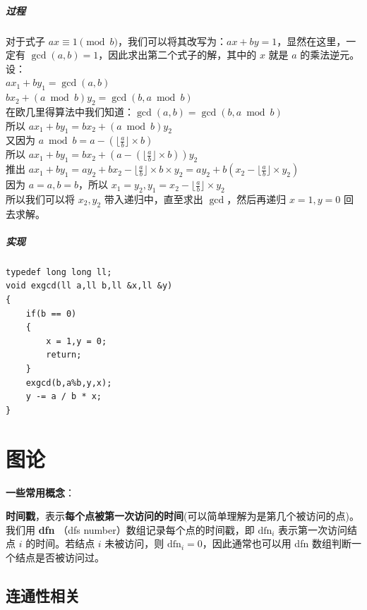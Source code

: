 \documentclass[11pt,oneside,a4paper,UTF8]{book}
\begin{document}
	\subsubsection{过程}
	\noindent
	对于式子 $ax \equiv 1 \pmod b$，我们可以将其改写为：$ax + by = 1$，显然在这里，一定有 $\gcd(a,b) = 1$，因此求出第二个式子的解，其中的 $x$ 就是 $a$ 的乘法逆元。\\
	设：\\
	$ax_1 + by_1 = \gcd(a,b)$\\
	$bx_2 + (a \bmod b)y_2 = \gcd(b,a \bmod b)$\\
	在欧几里得算法中我们知道：$\gcd(a,b) = \gcd(b,a\bmod b)$\\
	所以 $ax_1 + by_1 = bx_2 + (a \bmod b)y_2$\\
	又因为 $a \bmod b = a - (\lfloor\frac{a}{b}\rfloor\times b)$\\
	所以 $ax_1+by_1=bx_2+(a-(\lfloor\frac{a}{b}\rfloor\times b))y_2$\\
	推出 $ax_1+by_1=ay_2+bx_2-\lfloor\frac{a}{b}\rfloor\times b\times y_2=ay_2+b(x_2-\lfloor\frac{a}{b}\rfloor\times y_2)$\\
	因为 $a = a,b = b$，所以 $x_1=y_2,y_1=x_2-\lfloor\frac{a}{b}\rfloor\times y_2$\\
	所以我们可以将 $x_2,y_2$ 带入递归中，直至求出 $\gcd$，然后再递归 $x=1,y=0$ 回去求解。\\
	\subsubsection{实现}
	\begin{lstlisting}
typedef long long ll;
void exgcd(ll a,ll b,ll &x,ll &y)
{ 
	if(b == 0)
	{
		x = 1,y = 0;
		return;
	}
	exgcd(b,a%b,y,x);
	y -= a / b * x;
}
	\end{lstlisting}
	
	\part{图论}
	\noindent
	\textbf{一些常用概念}：\par
	\textbf{时间戳}，表示\textbf{每个点被第一次访问的时间}(可以简单理解为是第几个被访问的点)。我们用 \textbf{dfn} （dfs number）数组记录每个点的时间戳，即 $\text{dfn}_i$ 表示第一次访问结点 $i$ 的时间。若结点 $i$ 未被访问，则 $\text{dfn}_i = 0$，因此通常也可以用 dfn 数组判断一个结点是否被访问过。
	\chapter{连通性相关}
\end{document}
